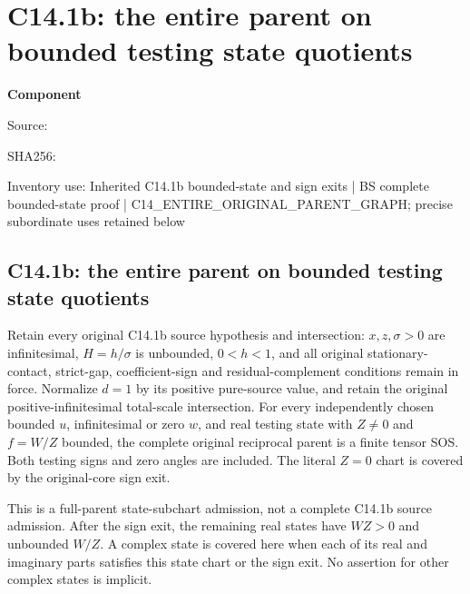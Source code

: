 \chapter{C14.1b: the entire parent on bounded testing state quotients}
\label{component:pff0a29ebf284}
\noindent\textbf{Component }\par
{\small\noindent Source: \par}
{\small\noindent SHA256: \par}
{\small\noindent Inventory use: Inherited C14.1b bounded-state and sign exits | BS complete bounded-state proof | C14\_\allowbreak{}ENTIRE\_\allowbreak{}ORIGINAL\_\allowbreak{}PARENT\_\allowbreak{}GRAPH; precise subordinate uses retained below\par}
\medskip
\section{C14.1b: the entire parent on bounded testing state quotients}
\label{pff0a29ebf284:sec:r17-c1-bounded-state}

\begin{theorem}
Retain every original C14.1b source hypothesis and intersection:
$x,z,\sigma>0$ are infinitesimal, $H=h/\sigma$ is unbounded,
$0<h<1$, and all original stationary-contact, strict-gap,
coefficient-sign and residual-complement conditions remain in force.
Normalize $d=1$ by its positive pure-source value, and retain the
original positive-infinitesimal total-scale intersection.
For every independently chosen bounded $u$, infinitesimal or zero $w$,
and real testing state with $Z\ne0$ and $f=W/Z$ bounded, the complete
original reciprocal parent is a finite tensor SOS. Both testing signs
and zero angles are included. The literal $Z=0$ chart is covered by
the original-core sign exit.
\end{theorem}

This is a full-parent state-subchart admission, not a complete C14.1b
source admission. After the sign exit, the remaining real states have
$WZ>0$ and unbounded $W/Z$. A complex state is covered here when
each of its real and imaginary parts satisfies this state chart or
the sign exit. No assertion for other complex states is implicit.

